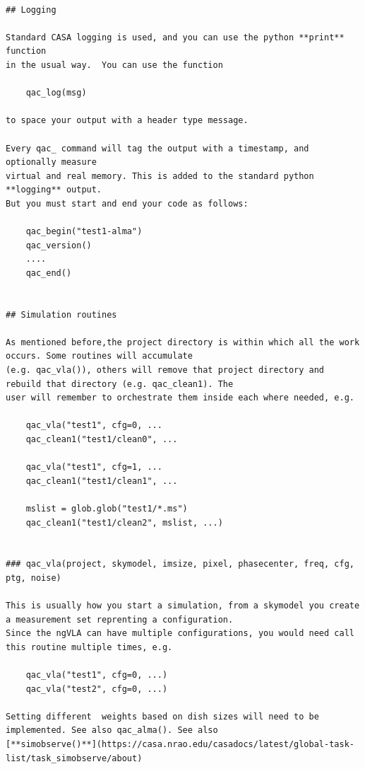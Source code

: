 \documentclass[11pt,twoside]{article}
\begin{document}
\footnotesize
\begin{verbatim}

## Logging

Standard CASA logging is used, and you can use the python **print** function
in the usual way.  You can use the function

    qac_log(msg)

to space your output with a header type message.

Every qac_ command will tag the output with a timestamp, and optionally measure
virtual and real memory. This is added to the standard python **logging** output.
But you must start and end your code as follows:

    qac_begin("test1-alma")
    qac_version()
    ....
    qac_end()


## Simulation routines

As mentioned before,the project directory is within which all the work occurs. Some routines will accumulate
(e.g. qac_vla()), others will remove that project directory and rebuild that directory (e.g. qac_clean1). The
user will remember to orchestrate them inside each where needed, e.g.

    qac_vla("test1", cfg=0, ...
    qac_clean1("test1/clean0", ...
    
    qac_vla("test1", cfg=1, ...
    qac_clean1("test1/clean1", ...

    mslist = glob.glob("test1/*.ms")
    qac_clean1("test1/clean2", mslist, ...)


### qac_vla(project, skymodel, imsize, pixel, phasecenter, freq, cfg, ptg, noise)

This is usually how you start a simulation, from a skymodel you create a measurement set reprenting a configuration.
Since the ngVLA can have multiple configurations, you would need call this routine multiple times, e.g.

    qac_vla("test1", cfg=0, ...)
    qac_vla("test2", cfg=0, ...)

Setting different  weights based on dish sizes will need to be implemented. See also qac_alma(). See also
[**simobserve()**](https://casa.nrao.edu/casadocs/latest/global-task-list/task_simobserve/about)


\end{verbatim}
\end{document}
